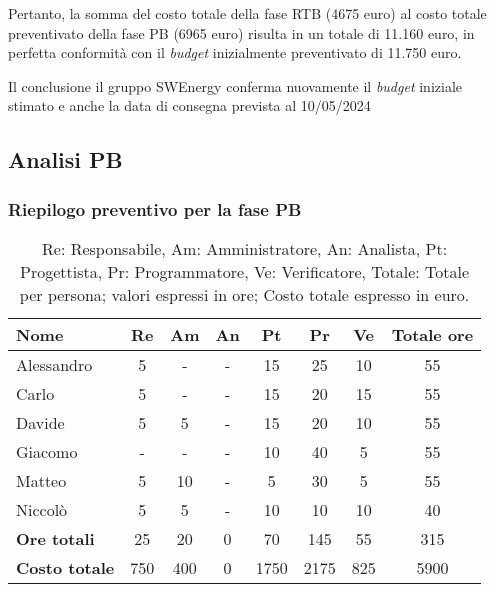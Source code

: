 Pertanto, la somma del costo totale della fase RTB (4675 euro) al costo totale preventivato della fase PB (6965 euro) risulta in un totale di 11.160 euro,
in perfetta conformità con il \textit{budget} inizialmente preventivato di 11.750 euro.


Il conclusione il gruppo SWEnergy conferma nuovamente il \textit{budget} iniziale stimato e anche la data di consegna prevista al 10/05/2024



\subsection{Analisi PB}
\subsubsection{Riepilogo preventivo per la fase PB}
\begin{table}[H]
	\centering
	\begin{tabular}{l|c|c|c|c|c|c|c}
		\textbf{Nome}         & \textbf{Re} & \textbf{Am} & \textbf{An} & \textbf{Pt} & \textbf{Pr} & \textbf{Ve} & \textbf{Totale ore} \\
		\hline
		Alessandro            & 5           & -           & -           & 15          & 25          & 10          & 55                  \\
		Carlo                 & 5           & -           & -           & 15          & 20          & 15          & 55                  \\
		Davide                & 5           & 5           & -           & 15          & 20          & 10          & 55                  \\
		Giacomo               & -           & -           & -           & 10          & 40          & 5           & 55                  \\
		Matteo                & 5           & 10          & -           & 5           & 30          & 5           & 55                  \\
		Niccolò               & 5           & 5           & -           & 10          & 10          & 10          & 40                  \\
		\hline
		\textbf{Ore totali}   & 25          & 20          & 0           & 70          & 145         & 55          & 315                 \\
		\textbf{Costo totale} & 750         & 400         & 0           & 1750        & 2175        & 825         & 5900
	\end{tabular}
	\caption{Re: Responsabile, Am: Amministratore, An: Analista, Pt: Progettista, Pr: Programmatore, Ve: Verificatore, Totale: Totale per persona; valori espressi in ore; Costo totale espresso in euro.}
\end{table}


